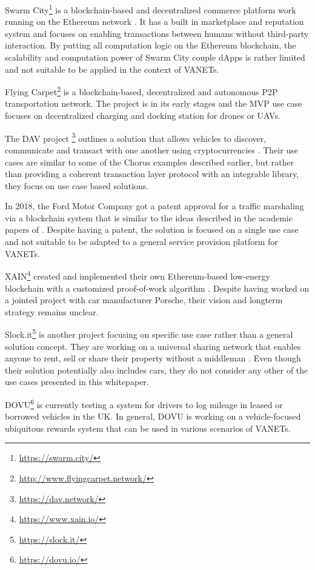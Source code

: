 \documentclass{llncs}
\begin{document}
{			Swarm City\footnote{\url{https://swarm.city/}} is a blockchain-based and decentralized commerce platform work running on the Ethereum network \cite{swarmWhitepaper1}\cite{swarmWhitepaper2}. It has a built in marketplace and reputation system and focuses on enabling transactions between humans without third-party interaction. By putting all computation logic on the Ethereum blockchain, the scalability and computation power of Swarm City couple dApps is rather limited and not suitable to be applied in the context of VANETs.

			Flying Carpet\footnote{\url{http://www.flyingcarpet.network/}} is a blockchain-based, decentralized and autonomous P2P transportation network. The project is in its early stages and the MVP use case focuses on decentralized charging and docking station for drones or UAVs.

			The DAV project \footnote{\url{https://dav.network/}} outlines a solution that allows vehicles to discover, communicate and transact with one another using cryptocurrencies \cite{davWhitepaper}. Their use cases are similar to some of the Chorus examples described earlier, but rather than providing a coherent transaction layer protocol with an integrable library, they focus on use case based solutions.
			
			In 2018, the Ford Motor Company got a patent approval for a traffic marshaling via a blockchain system \cite{macneille2018vehicle} that is similar to the ideas described in the academic papers of \cite{leiding2016self}. Despite having a patent, the solution is focused on a single use case and not suitable to be adapted to a general service provision platform for VANETs. 

			XAIN\footnote{\url{https://www.xain.io/}} created and implemented their own Ethereum-based low-energy blockchain with a customized proof-of-work algorithm \cite{xainWhitepaper}. Despite having worked on a jointed project with car manufacturer Porsche, their vision and longterm strategy remains unclear.

			Slock.it\footnote{\url{https://slock.it/}} is another project focusing on specific use case rather than a general solution concept. They are working on a universal sharing network that enables anyone to rent, sell or share their property without a middleman \cite{slockWhitepaper}. Even though their solution potentially also includes cars, they do not consider any other of the use cases presented in this whitepaper.

			DOVU\footnote{\url{https://dovu.io/}} \cite{dovuWhitepaper} is currently testing a system for drivers to log mileage in leased or borrowed vehicles in the UK. In general, DOVU is working on a vehicle-focused ubiquitous rewards system that can be used in various scenarios of VANETs.
			
}
\end{document}
